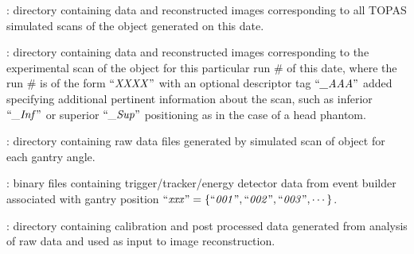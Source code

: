 \documentclass[landscape,12pt]{article}
\begin{document}
\begin{myEnumerate}[labelindent=1pt, leftmargin=*]
\begin{myEnumerate}[labelindent=1pt, leftmargin=*]
\begin{myEnumerate}[labelindent=1pt, leftmargin=*]
\begin{myEnumerate}[labelindent=1pt, leftmargin=*]
\begin{myEnumerate}[labelindent=1pt, leftmargin=*]
\begin{myEnumerate}[labelindent=1pt, leftmargin=*]
\begin{myEnumerate}[labelindent=1pt, leftmargin=*]
\begin{myEnumerate}[labelindent=1pt, leftmargin=*]
\begin{myEnumerate}[labelindent=1pt, leftmargin=*]
                                    \end{myEnumerate}
                                \end{myEnumerate}
                            \end{myEnumerate}
                        \end{myEnumerate}
                    \end{myEnumerate}
                \end{myEnumerate}
                \item {} \color{Black}: directory containing data and reconstructed images corresponding to all TOPAS simulated scans of the object generated on this date.
                \begin{myEnumerate}[labelindent=1pt, leftmargin=*]
                    \item {} \color{Black}: directory containing data and reconstructed images corresponding to the experimental scan of the object for this particular run \# of this date, where the run \# is of the form $\textrm{``\textit{XXXX}''}$ with an optional descriptor tag $\textrm{``\textit{\_AAA}''}$ added specifying additional pertinent information about the scan, such as inferior $\textrm{``\textit{\_Inf}''}$ or superior $\textrm{``\textit{\_Sup}''}$ positioning as in the case of a head phantom.
                    \begin{myEnumerate}[labelindent=1pt, leftmargin=*]
                        \item {} \color{Black}: directory containing raw data files generated by simulated scan of object for each gantry angle.
                        \begin{myEnumerate}[labelindent=1pt, leftmargin=*]
                            \item {} \color{Black}: binary files containing trigger/tracker/energy detector data from event builder associated with gantry position $\textrm{``\textit{xxx}''} =\{\textrm{``\textit{001}''}, \textrm{``\textit{002}''}, \textrm{``\textit{003}''}, \cdots\}$.
                        \end{myEnumerate}
                        \item {} \color{Black}: directory containing calibration and post processed data generated from analysis of raw data and used as input to image reconstruction.

\end{myEnumerate}
\end{myEnumerate}
\end{myEnumerate}
\end{myEnumerate}
\end{myEnumerate}
\end{document}
